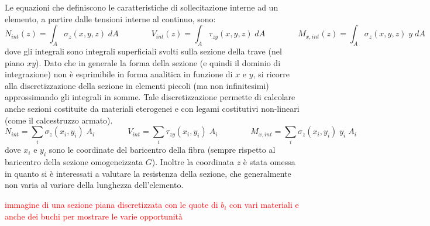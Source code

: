 \documentclass[10pt]{article}
\begin{document}
Le equazioni che definiscono le caratteristiche di sollecitazione interne ad un elemento, a partire dalle tensioni interne al continuo, sono:
\begin{equation}
N_{int}(z) = \int_A \sigma_z(x,y,z) \; dA 
\qquad \qquad
V_{int}(z) = \int_A \tau_{zy}(x,y,z) \; dA
\qquad \qquad
M_{x,int}(z) = \int_A \sigma_z(x,y,z) \; y \; dA
\end{equation}
dove gli integrali sono integrali superficiali svolti sulla sezione della trave (nel piano $xy$). Dato che in generale la forma della sezione (e quindi il dominio di integrazione) non è esprimibile in forma analitica in funzione di $x$ e $y$, si ricorre alla discretizzazione della sezione in elementi piccoli (ma non infinitesimi) approssimando gli integrali in somme.
Tale discretizzazione permette di calcolare anche sezioni costituite da materiali eterogenei e con legami costitutivi non-lineari (come il calcestruzzo armato).
\begin{equation}
N_{int} = \sum_i \sigma_z(x_i,y_i) \; A_i 
\qquad \qquad
V_{int} = \sum_i \tau_{zy}(x_i,y_i) \; A_i
\qquad \qquad
M_{x,int} = \sum_i \sigma_z(x_i,y_i) \; y_i \; A_i
\end{equation}
dove $x_i$ e $y_i$ sono le coordinate del baricentro della fibra (sempre rispetto al baricentro della sezione omogeneizzata $G$). Inoltre la coordinata $z$ è stata omessa in quanto si è interessati a valutare la resistenza della sezione, che generalmente non varia al variare della lunghezza dell'elemento.

\begin{center}
\textcolor{red}{immagine di una sezione piana discretizzata con le quote di $b_i$ con vari materiali e anche dei buchi per mostrare le varie opportunità}
\end{center}
\end{document}
